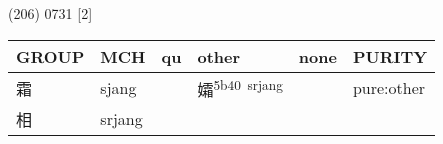 \documentclass[14pt,a4paper]{scrartcl}
\begin{document}
(206) 0731 {[}2{]}

\begin{longtable}[c]{@{}llllll@{}}
\toprule
\begin{minipage}[b]{0.14\columnwidth}\raggedright\strut
GROUP
\strut\end{minipage} &
\begin{minipage}[b]{0.14\columnwidth}\raggedright\strut
MCH
\strut\end{minipage} &
\begin{minipage}[b]{0.14\columnwidth}\raggedright\strut
qu
\strut\end{minipage} &
\begin{minipage}[b]{0.14\columnwidth}\raggedright\strut
other
\strut\end{minipage} &
\begin{minipage}[b]{0.14\columnwidth}\raggedright\strut
none
\strut\end{minipage} &
\begin{minipage}[b]{0.14\columnwidth}\raggedright\strut
PURITY
\strut\end{minipage}\tabularnewline
\midrule
\endhead
\begin{minipage}[t]{0.14\columnwidth}\raggedright\strut
霜
\strut\end{minipage} &
\begin{minipage}[t]{0.14\columnwidth}\raggedright\strut
sjang
\strut\end{minipage} &
\begin{minipage}[t]{0.14\columnwidth}\raggedright\strut
\strut\end{minipage} &
\begin{minipage}[t]{0.14\columnwidth}\raggedright\strut
孀\textsuperscript{5b40~srjang}
\strut\end{minipage} &
\begin{minipage}[t]{0.14\columnwidth}\raggedright\strut
\strut\end{minipage} &
\begin{minipage}[t]{0.14\columnwidth}\raggedright\strut
pure:other
\strut\end{minipage}\tabularnewline
\begin{minipage}[t]{0.14\columnwidth}\raggedright\strut
相
\strut\end{minipage} &
\begin{minipage}[t]{0.14\columnwidth}\raggedright\strut
srjang
\strut\end{minipage} &
\begin{minipage}[t]{0.14\columnwidth}\raggedright\strut

\end{minipage}
\end{longtable}
\end{document}
